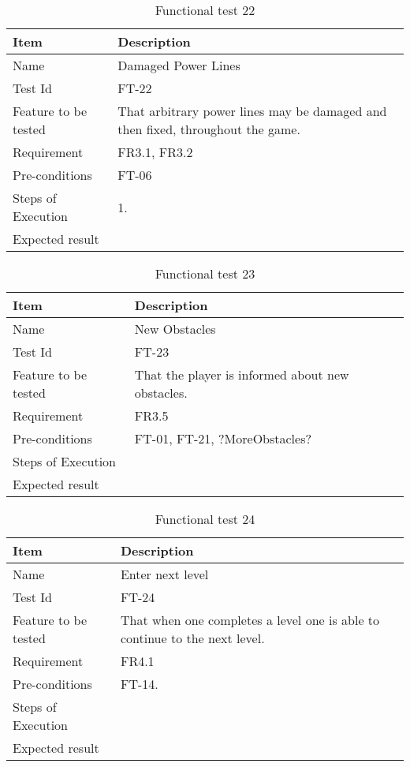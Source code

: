 \begin{table}[H]
\centering
	\begin{tabular}{ l | p{8cm} }
		\hline
		{\bf Item} & {\bf Description} \\ \hline
		Name & Damaged Power Lines \\ 
		Test Id & FT-22 \\ 
		Feature to be tested & That arbitrary power lines may be damaged and then fixed, throughout the game. \\ 
		Requirement & FR3.1, FR3.2  \\ 
		Pre-conditions & FT-06 \\ 
		Steps of Execution & 1. \\ 
		Expected result & \\ 
	\end{tabular}
	\caption{Functional test 22}
\end{table}

\begin{table}[H]
\centering
	\begin{tabular}{ l | p{8cm} }
		\hline
		{\bf Item} & {\bf Description} \\ \hline
		Name & New Obstacles \\ 
		Test Id & FT-23 \\ 
		Feature to be tested & That the player is informed about new obstacles. \\ 
		Requirement & FR3.5 \\ 
		Pre-conditions & FT-01, FT-21, ?MoreObstacles?\\ 
		Steps of Execution &  \\ 
		Expected result & \\ 
	\end{tabular}
	\caption{Functional test 23}
\end{table}

\begin{table}[H]
\centering
	\begin{tabular}{ l | p{8cm} }
		\hline
		{\bf Item} & {\bf Description} \\ \hline
		Name & Enter next level \\ 
		Test Id & FT-24 \\ 
		Feature to be tested & That when one completes a level one is able to continue to the next level. \\ 
		Requirement & FR4.1 \\ 
		Pre-conditions & FT-14. \\ 
		Steps of Execution & \\ 
		Expected result & \\ 
	\end{tabular}
	\caption{Functional test 24}
\end{table}


